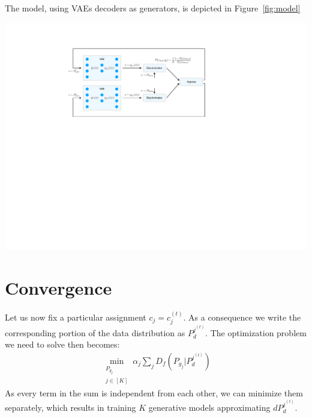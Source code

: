 \documentclass{article}
\newcommand{\Pd}{P_{d}}
\begin{document}
The model, using VAEs decoders as generators, is depicted in Figure~\ref{fig:model}
\begin{minipage}{0.5\textwidth}
\includegraphics[scale=0.5]{pics/model.pdf}
\end{minipage}\label{fig:model}

 
\section{Convergence}
Let us now fix a particular assignment $c_j = c_j^{(t)}$. As a consequence we write the corresponding portion of the data distribution as $\Pd^{j^{(t)}}$. The optimization problem we need to solve then becomes:
\begin{align*}
\min_{\substack{P_{g_j} \\ j \in [K]}} \alpha_j\sum_j D_f(P_{g_j}| \Pd^{j^{(t)}})
\end{align*}
As every term in the sum is independent from each other, we can minimize them separately, which results in training $K$ generative models approximating $d\Pd^{j^{(t)}}$.
\end{document}
